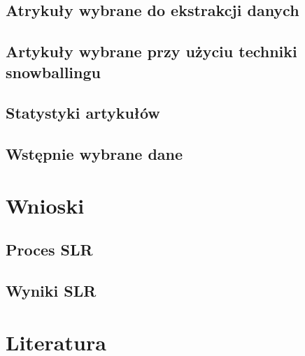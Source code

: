 \documentclass[polish,envcountsect,10pt]{article}
\begin{document}
\subsection{Atrykuły wybrane do ekstrakcji danych}

\subsection{Artykuły wybrane przy użyciu techniki snowballingu}

\subsection{Statystyki artykułów}

\subsection{Wstępnie wybrane dane}

\section{Wnioski}

\subsection{Proces SLR}

\subsection{Wyniki SLR}

\section{Literatura}
\end{document}
